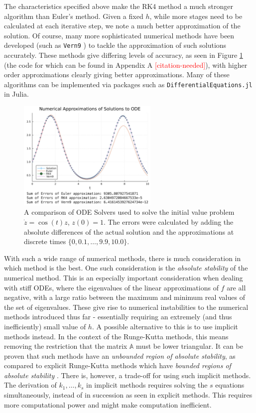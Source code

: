 \documentclass[a4paper,11pt,titlepage]{article}
\newcommand{\citationneeded}{\textcolor{red}{[citation-needed]}}
\theoremstyle{definition}
\theoremstyle{plain}
\theoremstyle{remark}
\begin{document}
The characteristics specified above make the RK4 method a much stronger algorithm than Euler's method. Given a fixed $h$, while more stages need to be calculated at each iterative step, we note a much better approximation of the solution. Of course, many more sophisticated numerical methods have been developed (such as \texttt{Vern9} \cite{verner2010}) to tackle the approximation of such solutions accurately. These methods give differing levels of accuracy, as seen in Figure \ref{fig:odesolver} (the code for which can be found in Appendix A \citationneeded), with higher order approximations clearly giving better approximations. Many of these algorithms can be implemented via packages such as \texttt{DifferentialEquations.jl} in Julia.

\begin{figure}
    \centering
    \includegraphics[width=0.6\textwidth]{report/figures/ODESolvers.png}
    \caption{A comparison of ODE Solvers used to solve the initial value problem $\dot{z} = \cos(t)z$, $z(0) = 1$. The errors were calculated by adding the absolute differences of the actual solution and the approximations at discrete times $\{0, 0.1, \dots, 9.9, 10.0\}$.}
    \label{fig:odesolver}
\end{figure}

With such a wide range of numerical methods, there is much consideration in which method is the best. One such consideration is the \textit{absolute stability} of the numerical method. This is an especially important consideration when dealing with stiff ODEs, where the eigenvalues of the linear approximations of $f$ are all negative, with a large ratio between the maximum and minimum real values of the set of eigenvalues. These give rise to numerical instabilities to the numerical methods introduced thus far - essentially requiring an extremely (and thus inefficiently) small value of $h$. A possible alternative to this is to use implicit methods instead. In the context of the Runge-Kutta methods, this means removing the restriction that the matrix $\mathbb{A}$ must be lower triangular. It can be proven that such methods have an \textit{unbounded region of absolute stability}, as compared to explicit Runge-Kutta methods which have \textit{bounded regions of absolute stability} \cite{sulimayers2003}. There is, however, a trade-off for using such implicit methods. The derivation of $k_1, \dots, k_s$ in implicit methods requires solving the $s$ equations simultaneously, instead of in succession as seen in explicit methods. This requires more computational power and might make computation inefficient.
\end{document}
